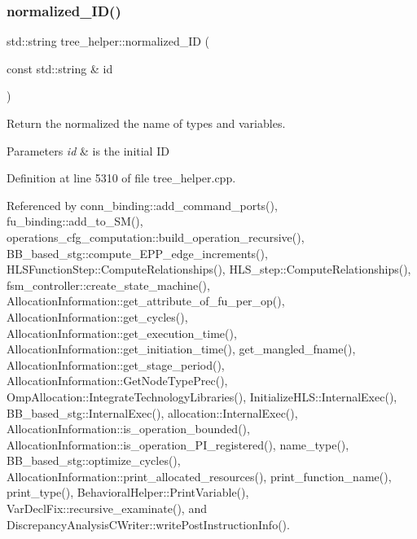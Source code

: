 \subsubsection{\texorpdfstring{normalized\+\_\+\+I\+D()}{normalized\_ID()}}
{\footnotesize\ttfamily std\+::string tree\+\_\+helper\+::normalized\+\_\+\+ID (\begin{DoxyParamCaption}\item[{const std\+::string \&}]{id }\end{DoxyParamCaption})\hspace{0.3cm}{\ttfamily [static]}}



Return the normalized the name of types and variables. 


\begin{DoxyParams}{Parameters}
{\em id} & is the initial ID \\
\hline
\end{DoxyParams}


Definition at line 5310 of file tree\+\_\+helper.\+cpp.



Referenced by conn\+\_\+binding\+::add\+\_\+command\+\_\+ports(), fu\+\_\+binding\+::add\+\_\+to\+\_\+\+S\+M(), operations\+\_\+cfg\+\_\+computation\+::build\+\_\+operation\+\_\+recursive(), B\+B\+\_\+based\+\_\+stg\+::compute\+\_\+\+E\+P\+P\+\_\+edge\+\_\+increments(), H\+L\+S\+Function\+Step\+::\+Compute\+Relationships(), H\+L\+S\+\_\+step\+::\+Compute\+Relationships(), fsm\+\_\+controller\+::create\+\_\+state\+\_\+machine(), Allocation\+Information\+::get\+\_\+attribute\+\_\+of\+\_\+fu\+\_\+per\+\_\+op(), Allocation\+Information\+::get\+\_\+cycles(), Allocation\+Information\+::get\+\_\+execution\+\_\+time(), Allocation\+Information\+::get\+\_\+initiation\+\_\+time(), get\+\_\+mangled\+\_\+fname(), Allocation\+Information\+::get\+\_\+stage\+\_\+period(), Allocation\+Information\+::\+Get\+Node\+Type\+Prec(), Omp\+Allocation\+::\+Integrate\+Technology\+Libraries(), Initialize\+H\+L\+S\+::\+Internal\+Exec(), B\+B\+\_\+based\+\_\+stg\+::\+Internal\+Exec(), allocation\+::\+Internal\+Exec(), Allocation\+Information\+::is\+\_\+operation\+\_\+bounded(), Allocation\+Information\+::is\+\_\+operation\+\_\+\+P\+I\+\_\+registered(), name\+\_\+type(), B\+B\+\_\+based\+\_\+stg\+::optimize\+\_\+cycles(), Allocation\+Information\+::print\+\_\+allocated\+\_\+resources(), print\+\_\+function\+\_\+name(), print\+\_\+type(), Behavioral\+Helper\+::\+Print\+Variable(), Var\+Decl\+Fix\+::recursive\+\_\+examinate(), and Discrepancy\+Analysis\+C\+Writer\+::write\+Post\+Instruction\+Info().

